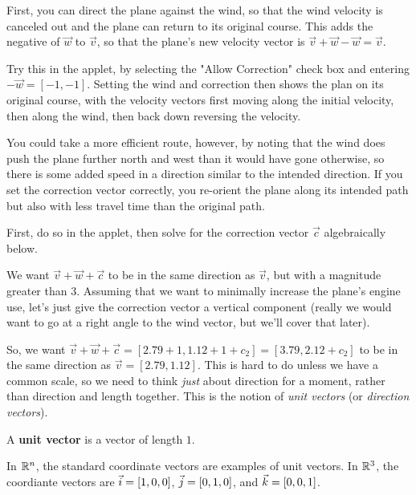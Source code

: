 \documentclass{ximera}
\begin{document}
\begin{problem}
  First, you can direct the plane against the wind, so that the wind velocity is canceled out and the plane can return to its original course. This adds the negative of $\vec{w}$ to $\vec{v}$, so that the plane's new velocity vector is $\vec{v}+\vec{w}-\vec{w}=\vec{v}$.

  Try this in the applet, by selecting the "Allow Correction" check box and entering $-\vec{w}=[-1,-1]$. Setting the wind and correction then shows the plan on its original course, with the velocity vectors first moving along the initial velocity, then along the wind, then back down reversing the velocity. 

  \begin{center}
  \end{center}

  You could take a more efficient route, however, by noting that the wind does push the plane further north and west than it would have gone otherwise, so there is some added speed in a direction similar to the intended direction. If you set the correction vector correctly, you re-orient the plane along its intended path but also with less travel time than the original path.

  First, do so in the applet, then solve for the correction vector $\vec{c}$ algebraically below.
  
  We want $\vec{v}+\vec{w}+\vec{c}$ to be in the same direction as $\vec{v}$, but with a magnitude greater than $3$. Assuming that we want to minimally increase the plane's engine use, let's just give the correction vector a vertical component (really we would want to go at a right angle to the wind vector, but we'll cover that later). 

  So, we want $\vec{v}+\vec{w}+\vec{c}=[2.79+1,1.12+1+c_2]=[3.79,2.12+c_2]$ to be in the same direction as $\vec{v}=[2.79,1.12]$. This is hard to do unless we have a common scale, so we need to think \emph{just} about direction for a moment, rather than direction and length together. This is the notion of \textit{unit vectors} (or \textit{direction vectors}).

  \begin{definition}

    A \textbf{unit vector} is a vector of length $1$. 

    In $\mathbb{R}^n$, the standard coordinate vectors are examples of unit vectors. In $\mathbb{R}^3$, the coordiante vectors are $\vec{i}=[1,0,0]$, $\vec{j}=[0,1,0]$, and $\vec{k}=[0,0,1]$.
  \end{definition}


\end{problem}
\end{document}
